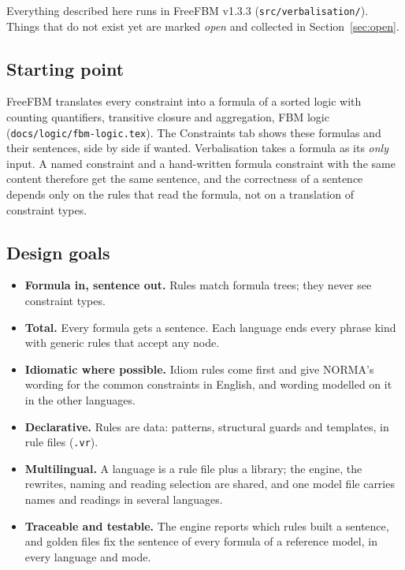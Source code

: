 \documentclass[11pt, a4paper]{article}
\newcommand{\code}[1]{\texttt{\color{codefg}#1}}
\begin{document}
Everything described here runs in FreeFBM v1.3.3 (\code{src/verbalisation/}).
Things that do not exist yet are marked \emph{open} and collected in
Section~\ref{sec:open}.

\subsection{Starting point}

FreeFBM translates every constraint into a formula of a sorted logic with
counting quantifiers, transitive closure and aggregation, FBM logic
(\code{docs/logic/fbm-logic.tex}). The Constraints tab shows these formulas
and their sentences, side by side if wanted. Verbalisation takes a formula as
its \emph{only} input. A named constraint and a hand-written formula
constraint with the same content therefore get the same sentence, and the
correctness of a sentence depends only on the rules that read the formula,
not on a translation of constraint types.

\subsection{Design goals}

\begin{itemize}
  \item \textbf{Formula in, sentence out.} Rules match formula trees; they
        never see constraint types.
  \item \textbf{Total.} Every formula gets a sentence. Each language ends
        every phrase kind with generic rules that accept any node.
  \item \textbf{Idiomatic where possible.} Idiom rules come first and give
        NORMA's wording for the common constraints in English, and wording
        modelled on it in the other languages.
  \item \textbf{Declarative.} Rules are data: patterns, structural guards and
        templates, in rule files (\code{.vr}).
  \item \textbf{Multilingual.} A language is a rule file plus a library; the
        engine, the rewrites, naming and reading selection are shared, and
        one model file carries names and readings in several languages.
  \item \textbf{Traceable and testable.} The engine reports which rules built
        a sentence, and golden files fix the sentence of every formula of a
        reference model, in every language and mode.
\end{itemize}
\end{document}
